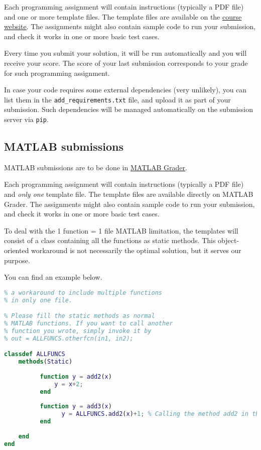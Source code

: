 \documentclass[11pt, reqno]{amsart} %
\newcommand{\website}{http://motion.me.ucsb.edu/ME179P-Winter2022/index.html}
\newcommand{\mgrader}{https://grader.mathworks.com/courses/64655-me-ece179p-winter-2022-ucsb}
\begin{document}
\noindent
Each programming assignment will contain instructions (typically a PDF file) and one or more template files.
The template files are available on the \href{\website}{course website}.
The assignments might also contain sample code to run your submission, and check it works in one or more basic test cases.

\noindent
Every time you submit your solution, it will be run automatically and you will receive your score.
The score of your last submission corresponds to your grade for such programming assignment.

\noindent
In case your code requires some external dependencies (very unlikely), you can list them in the \texttt{add\_requirements.txt} file, and upload it as part of your submission.
Such dependencies will be managed automatically on the submission server via \texttt{pip}.

\subsection{MATLAB submissions}
MATLAB submissions are to be done in \href{\mgrader}{MATLAB Grader}.

\noindent
Each programming assignment will contain instructions (typically a PDF file) and \textit{only one} template file.
The template files are available directly on MATLAB Grader.
The assignments might also contain sample code to run your submission, and check it works in one or more basic test cases.

To deal with the 1 function = 1 file MATLAB limitation, the templates will consist of a class containing all the functions as static methods.
This object-oriented workaround is not necessarily the optimal solution, but it serves our purpose.

You can find an example below.

\begin{lstlisting}[language=MATLAB, frame=single, caption=File ALLFUNCS.m .\\]
% Using a class with static methods is
% a workaround to include multiple functions
% in only one file.

% Please fill the static methods as normal
% MATLAB functions. If you want to call another
% function you wrote, simply invoke it by
% out = ALLFUNCS.otherfcn(in1, in2);

classdef ALLFUNCS
    methods(Static)
        
          function y = add2(x)
              y = x+2;
          end
          
          function y = add3(x)
                y = ALLFUNCS.add2(x)+1; % Calling the method add2 in the same class
          end
          
    end
end

\end{lstlisting}
\end{document}
